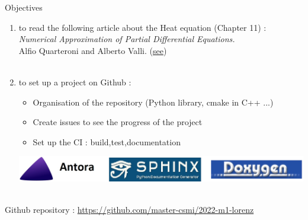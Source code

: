 \documentclass[10pt,xcolor={table,dvipsnames},t]{beamer}
\begin{document}
	\begin{frame}{Objectives}
		
		\begin{enumerate}[\textbullet]
			\item to read the following article about the Heat equation (Chapter 11) : \\ \textit{Numerical Approximation of Partial Differential Equations.} \\
			Alfio Quarteroni and Alberto Valli.    (\href{https://link.springer.com/content/pdf/10.1007/978-3-540-85268-1.pdf}{see}) \\ \; \\
			\item to set up a project on Github :
			\begin{itemize}
				\item Organisation of the repository (Python library, cmake in C++ ...)
				\item Create issues to see the progress of the project
				\item Set up the CI : build,test,documentation 
			\end{itemize}
			\includegraphics[width=\linewidth]{images/intro/logo.jpg}
		\end{enumerate} \; \\
		Github repository : \url{https://github.com/master-csmi/2022-m1-lorenz}
	
	\end{frame}
	
\end{document}
